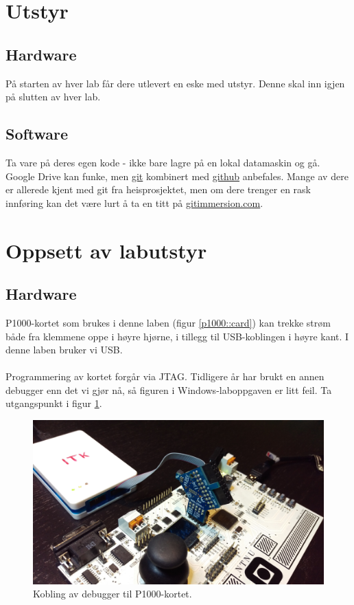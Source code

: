 \documentclass[11pt,a4paper]{article}
\begin{document}
\section{Utstyr}
\subsection{Hardware}
På starten av hver lab får dere utlevert en eske med utstyr. Denne skal inn igjen på slutten av hver lab.
\subsection{Software}
Ta vare på deres egen kode - ikke bare lagre på en lokal datamaskin og gå. Google Drive kan funke, men \href{https://git-scm.com/}{git} kombinert med \href{https://github.com/}{github} anbefales. Mange av dere er allerede kjent med git fra heisprosjektet, men om dere trenger en rask innføring kan det være lurt å ta en titt på \href{http://gitimmersion.com/}{gitimmersion.com}.
\section{Oppsett av labutstyr}
\subsection{Hardware}
\label{Setup::Hardware}
P1000-kortet som brukes i denne laben (figur \ref{p1000::card}) kan trekke strøm både fra klemmene oppe i høyre hjørne, i tillegg til USB-koblingen i høyre kant. I denne laben bruker vi USB.\\
\\
Programmering av kortet forgår via JTAG. Tidligere år har brukt en annen debugger enn det vi gjør nå, så figuren i Windows-laboppgaven er litt feil. Ta utgangspunkt i figur \ref{JTAG::conn}.
\begin{figure}[h]
\centering
\includegraphics[width=0.8\linewidth]{jtag.jpg}
\caption{Kobling av debugger til P1000-kortet.}
\label{JTAG::conn}
\end{figure}
\end{document}
